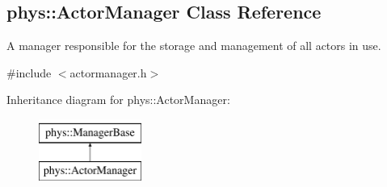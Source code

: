 \hypertarget{classphys_1_1ActorManager}{
\subsection{phys::ActorManager Class Reference}
\label{d3/dcf/classphys_1_1ActorManager}
}


A manager responsible for the storage and management of all actors in use.  




{\ttfamily \#include $<$actormanager.h$>$}

Inheritance diagram for phys::ActorManager:\begin{figure}[H]
\begin{center}
\leavevmode
\includegraphics[height=2.000000cm]{d3/dcf/classphys_1_1ActorManager}
\end{center}
\end{figure}
